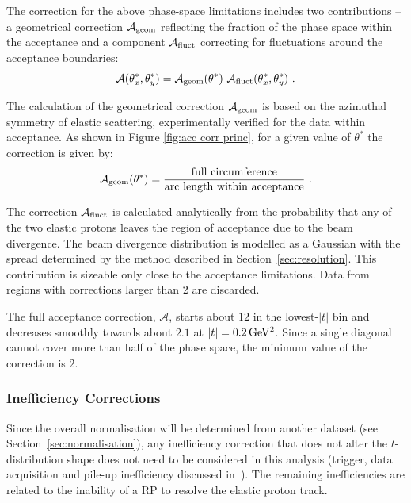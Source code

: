 The correction for the above phase-space limitations includes two contributions -- a geometrical correction $\mathcal{A}_{\rm geom}$ reflecting the fraction of the phase space within the acceptance and a component $\mathcal{A}_{\rm fluct}$ correcting for fluctuations around the acceptance boundaries:
\begin{equation}
\mathcal{A}(\theta^*_x, \theta_y^*) = \mathcal{A}_{\rm geom}(\theta^*)\ \mathcal{A}_{\rm fluct}(\theta^*_x, \theta_y^*)\ .
\end{equation}

The calculation of the geometrical correction $\mathcal{A}_{\rm geom}$ is based on the azimuthal symmetry of elastic scattering, experimentally verified for the data within acceptance. As shown in Figure \ref{fig:acc corr princ}, for a given value of $\theta^*$ the correction is given by:
\begin{equation}
\label{eq:acc geom}
\mathcal{A_{\rm geom}}(\theta^*) = {
	\hbox{full circumference}\over 
	\hbox{arc length within acceptance}
} \ .
\end{equation}

The correction $\mathcal{A}_{\rm fluct}$ is calculated analytically from the probability that any of the two elastic protons leaves the region of acceptance due to the beam divergence. The beam divergence distribution is modelled as a Gaussian with the spread determined by the method described in Section~\ref{sec:resolution}. This contribution is sizeable only close to the acceptance limitations. Data from regions with corrections larger than $2$ are discarded.

The full acceptance correction, $\mathcal{A}$, starts about $12$ in the lowest-$|t|$ bin and decreases smoothly towards about $2.1$ at $|t| = 0.2\,{\rm GeV^2}$. Since a single diagonal cannot cover more than half of the phase space, the minimum value of the correction is $2$.




\subsubsection{Inefficiency Corrections}
\label{sec:ineff corr}

Since the overall normalisation will be determined from another dataset (see Section~\ref{sec:normalisation}), any inefficiency correction that does not alter the $t$-distribution shape does not need to be considered in this analysis (trigger, data acquisition and pile-up inefficiency discussed in~\cite{epl101-el,prl111}). The remaining inefficiencies are related to the inability of a RP to resolve the elastic proton track.

